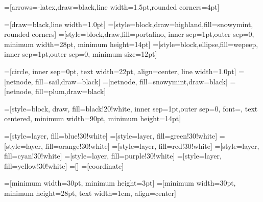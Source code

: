 \usetikzlibrary{shapes,arrows,positioning,calc,chains,scopes}


=[arrows={-latex},draw=black,line width=1.5pt,rounded corners=4pt]

=[draw=black,line width=1.0pt]
=[style=block,draw=highland,fill=snowymint,
    rounded corners]
=[style=block,draw,fill=portafino,
    inner sep=1pt,outer sep=0,
    minimum width=28pt, minimum height=14pt]
=[style=block,ellipse,fill=wepeep,
    inner sep=1pt,outer sep=0, minimum size=12pt]

\def\iolen{24pt}
\def\intergape{2pt}

=[circle, inner sep=0pt, text width=22pt, align=center, line width=1.0pt]
=[netnode, fill=sail,draw=black]
=[netnode, fill=snowymint,draw=black]
=[netnode, fill=plum,draw=black]

\def\layerwidth{90pt}
\def\layerheight{14pt}

=[style=block, draw, fill=black!20!white,
    inner sep=1pt,outer sep=0, font=\footnotesize,
    text centered, 
    minimum width=\layerwidth, minimum height=\layerheight]

=[style=layer, fill=blue!30!white]
=[style=layer, fill=green!30!white]
=[style=layer, fill=orange!30!white]
=[style=layer, fill=red!30!white]
=[style=layer, fill=cyan!30!white]
=[style=layer, fill=purple!30!white]
=[style=layer, fill=yellow!30!white]
=[]
=[coordinate]

\def\vlayerwidth{30pt}
\def\vlayerheight{3pt}
\def\vblockheight{28pt}

=[minimum width=\vlayerwidth, minimum height=\vlayerheight]
=[minimum width=\vlayerwidth, minimum height=\vblockheight, text width=1cm, align=center]


